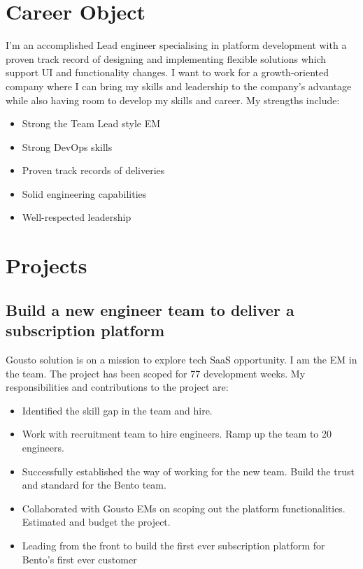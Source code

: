 \documentclass[a4paper]{twentysecondcv-english} %
\begin{document}
\section{Career Object}

I'm an accomplished Lead engineer specialising in platform development with a proven track record of designing and implementing flexible solutions which support UI and functionality changes. I want to work for a growth-oriented company where I can bring my skills and leadership to the company's advantage while also having room to develop my skills and career. My strengths include:
\begin{itemize}
  \item Strong the Team Lead style EM
  \item Strong DevOps skills
  \item Proven track records of deliveries
  \item Solid engineering capabilities
  \item Well-respected leadership
\end{itemize}

\section{Projects}

\subsection{Build a new engineer team to deliver a subscription platform}

Gousto solution is on a mission to explore tech SaaS opportunity. I am the EM in the team. The project has been scoped for 77 development weeks. My responsibilities and contributions to the project are:
\begin{itemize}
    \item Identified the skill gap in the team and hire.
    \item Work with recruitment team to hire engineers. Ramp up the team to 20 engineers.
    \item Successfully established the way of working for the new team. Build the trust and standard for the Bento team.
    \item Collaborated with Gousto EMs on scoping out the platform functionalities. Estimated and budget the project.
    \item Leading from the front to build the first ever subscription platform for Bento's first ever customer
\end{itemize}
\end{document}
